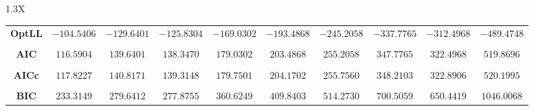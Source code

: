 \documentclass[10pt]{article}
\begin{document}
{\begin{tabularx}{1.3\textwidth}{X}
{\begin{tabular}{cccccccccc}
\cmidrule(r){1-10} \\
 { {\bf OptLL} }& $-104.5406$ & $-129.6401$ & $-125.8304$ & $-169.0302$ & $-193.4868$ & $-245.2058$ & $-337.7765$& $-312.4968$& $-489.4748$ \\
\cmidrule(r){1-10} \\
 { {\bf AIC} }& $116.5904$ & $139.6401$ & $138.3470$ & $179.0302$ & $203.4868$ & $255.2058$ & $347.7765$& $322.4968$& $519.8696$ \\
\cmidrule(r){1-10} \\
 { {\bf AICc} }& $117.8227$ & $140.8171$ & $139.3148$ & $179.7501$ & $204.1702$ & $255.7560$ & $348.2103$& $322.8906$& $520.1995$ \\
\cmidrule(r){1-10} \\
 { {\bf BIC} }& $233.3149$ & $279.6412$ & $277.8755$ & $360.6249$ & $409.8403$ & $514.2730$ & $700.5059$& $650.4419$& $1046.0068$ \\
\bottomrule
\end{tabular}}
\end{tabularx}}

  \vspace{3 cm}

  
\end{document}
